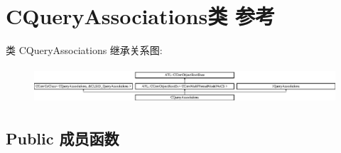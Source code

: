 \hypertarget{class_c_query_associations}{}\section{C\+Query\+Associations类 参考}
\label{class_c_query_associations}
类 C\+Query\+Associations 继承关系图\+:\begin{figure}[H]
\begin{center}
\leavevmode
\includegraphics[height=1.369193cm]{class_c_query_associations}
\end{center}
\end{figure}
\subsection*{Public 成员函数}

